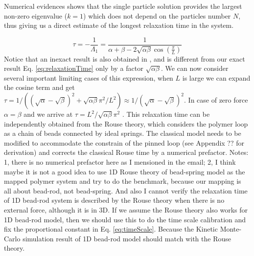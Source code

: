 \documentclass[aps,showpacs,twocolumn,floatfix,prx,superscriptaddress]{revtex4-1}
\begin{document}
Numerical evidences shows that the single particle solution provides the largest non-zero eigenvalue ($k=1$) which does not depend on the particles number $N$, thus giving us a direct estimate of the longest relaxation time in the system.  


\begin{equation}
    \label{eq:relaxationTime}
    \tau = -\frac{1}{\Lambda_1} = \frac{1}{\alpha+\beta-2\sqrt{\alpha\beta}\cos(\frac{\pi}{L})}
\end{equation}
Notice that an inexact result is also obtained in \cite{}, and is different from our exact result Eq. \eqref{eq:relaxationTime} only by a factor $\sqrt{\alpha\beta}$. We can now consider several important limiting cases of this expression, when $L$ is large we can expand the cosine term and get $\tau = 1/\left((\sqrt{\alpha}-\sqrt{\beta})^2 + \sqrt{\alpha\beta}\pi^2/L^2\right)\approx 1/(\sqrt{\alpha}-\sqrt{\beta})^2$. In case of zero force $\alpha=\beta$ and we arrive at $\tau=L^2/\sqrt{\alpha\beta}\pi^2$ . This relaxation time can be independently obtained from the Rouse theory, which considers the polymer loop as a chain of beads connected by ideal springs. The classical model \cite{} needs to be modified to accommodate the constrain of the pinned loop (see Appendix ?? for derivation) and corrects the classical Rouse time by a numerical prefactor. 
{\color{red} Notes: 1, there is no numerical prefactor here as I mensioned in the email; 2, I think maybe it is not a good idea to use 1D Rouse theory of bead-spring model as the mapped polymer system and try to do the benchmark, because our mapping is all about bead-rod, not bead-spring. And also I cannot verify the relaxation time of 1D bead-rod system is described by the Rouse theory when there is no external force, although it is in 3D. If we assume the Rouse theory also works for 1D bead-rod model, then we should use this to do the time scale calibration and fix the proportional constant in Eq. \eqref{eq:timeScale}. Because the Kinetic Monte-Carlo simulation result of 1D bead-rod model should match with the Rouse theory.} 
\end{document}
